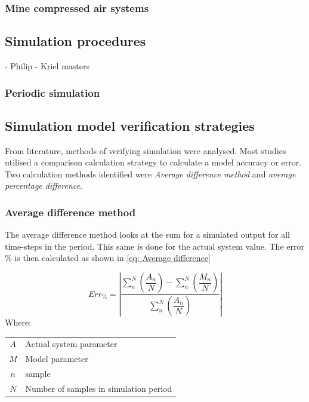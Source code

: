 	\subsubsection{Mine compressed air systems}
		
	\subsection{Simulation procedures}
		- Philip
		- Kriel masters\\
		\subsubsection{Periodic simulation}
 	\subsection{Simulation model verification strategies}
 	From literature, methods of verifying simulation were analysed. Most studies utilised a comparison calculation strategy to calculate a model accuracy or error. Two calculation methods identified were \emph{Average difference method} and \emph{average percentage difference}. 
 		\subsubsection{Average difference method}
 			The average difference method looks at the sum for a simulated output for all time-steps in the period. This same is done for the actual system value. The error \% is then calculated as shown in \cref{eq: Average difference}
 			
 			\begin{equation}
 				\label{eq: Average difference}
 				Err_{\%} = \left| \dfrac{ \sum_{n}^{N}{ \left( \dfrac{A_{n}}{N} \right)}  - \sum_{n}^{N}{ \left( \dfrac{M_{n}}{N} \right) } }{ \sum_{n}^{N}{ \left( \dfrac{A_{n}}{N} \right) } } \right|
 			\end{equation}
 			Where: 
 				\begin{table}[h!]
 					\centering
 					\begin{tabular}{cl}
 						$A$ & Actual system parameter \\
 						$M$ & Model parameter \\
 						$n$ & sample \\
 						$N$ & Number of samples in simulation period \\
 					\end{tabular} 
 				\end{table}	
